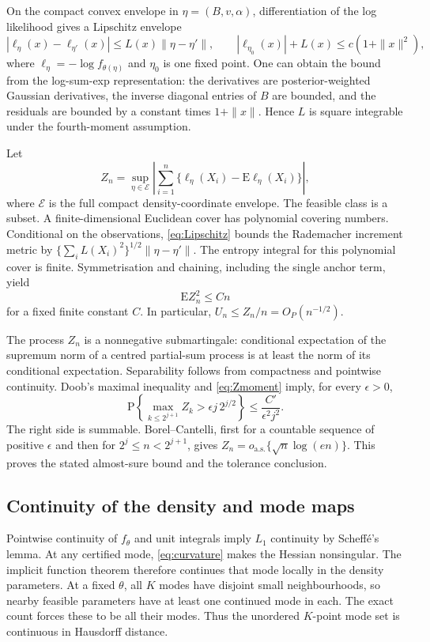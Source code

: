 \documentclass[12pt,a4paper]{article}
\theoremstyle{remark}
\newcommand{\E}{\mathrm E}
\newcommand{\Pp}{\mathrm P}
\begin{document}
On the compact convex envelope in $\eta=(B,v,\alpha)$, differentiation of the log likelihood gives a Lipschitz envelope
\begin{equation}\label{eq:Lipschitz}
 |\ell_\eta(x)-\ell_{\eta'}(x)|
 \le L(x)\|\eta-\eta'\|,\qquad
 |\ell_{\eta_0}(x)|+L(x)\le c(1+\|x\|^2),
\end{equation}
where $\ell_\eta=-\log f_{\theta(\eta)}$ and $\eta_0$ is one fixed point. One can obtain the bound from the log-sum-exp representation: the derivatives are posterior-weighted Gaussian derivatives, the inverse diagonal entries of $B$ are bounded, and the residuals are bounded by a constant times $1+\|x\|$. Hence $L$ is square integrable under the fourth-moment assumption.

Let
\[
 Z_n=\sup_{\eta\in\mathcal E}
       \left|\sum_{i=1}^n\{\ell_\eta(X_i)-\E\ell_\eta(X_i)\}\right|,
\]
where $\mathcal E$ is the full compact density-coordinate envelope. The feasible class is a subset. A finite-dimensional Euclidean cover has polynomial covering numbers. Conditional on the observations, \eqref{eq:Lipschitz} bounds the Rademacher increment metric by
$\{\sum_iL(X_i)^2\}^{1/2}\|\eta-\eta'\|$.
The entropy integral for this polynomial cover is finite. Symmetrisation and chaining, including the single anchor term, yield
\begin{equation}\label{eq:Zmoment}
 \E Z_n^2\le Cn
\end{equation}
for a fixed finite constant $C$. In particular, $U_n\le Z_n/n=O_P(n^{-1/2})$.

The process $Z_n$ is a nonnegative submartingale: conditional expectation of the supremum norm of a centred partial-sum process is at least the norm of its conditional expectation. Separability follows from compactness and pointwise continuity. Doob's maximal inequality and \eqref{eq:Zmoment} imply, for every $\epsilon>0$,
\[
 \Pp\left\{\max_{k\le2^{j+1}}Z_k>
                 \epsilon j\,2^{j/2}\right\}
 \le \frac{C'}{\epsilon^2j^2}.
\]
The right side is summable. Borel--Cantelli, first for a countable sequence of positive $\epsilon$ and then for $2^j\le n<2^{j+1}$, gives
$Z_n=o_{\mathrm{a.s.}}\{\sqrt n\log(en)\}$. This proves the stated almost-sure bound and the tolerance conclusion.

\subsection{Continuity of the density and mode maps}

Pointwise continuity of $f_\theta$ and unit integrals imply $L_1$ continuity by Scheffé's lemma. At any certified mode, \eqref{eq:curvature} makes the Hessian nonsingular. The implicit function theorem therefore continues that mode locally in the density parameters. At a fixed $\theta$, all $K$ modes have disjoint small neighbourhoods, so nearby feasible parameters have at least one continued mode in each. The exact count forces these to be all their modes. Thus the unordered $K$-point mode set is continuous in Hausdorff distance.
\end{document}
